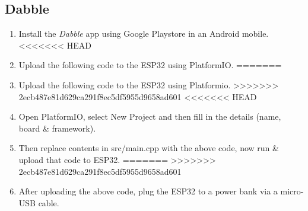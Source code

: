 \documentclass[conference]{IEEEtran}
\begin{document}
\subsection{Dabble}
\begin{enumerate}

\item Install the {\em Dabble} app using Google Playstore in an Android mobile.
<<<<<<< HEAD
\item Upload the following code to the ESP32 using PlatformIO.
=======
\item Upload the following code to the ESP32 using Platformio.
>>>>>>> 2ecb487e81d629ca291f8ec5df5955d9658ad601
<<<<<<< HEAD
\item Open PlatformIO, select New Project and then fill in the details (name, board \& framework).
\item Then replace contents in src/main.cpp with the above code, now run \& upload that code to ESP32.
=======
>>>>>>> 2ecb487e81d629ca291f8ec5df5955d9658ad601
\item After uploading the above code, plug the ESP32 to a power bank via a micro-USB cable.


\end{enumerate}
\end{document}
